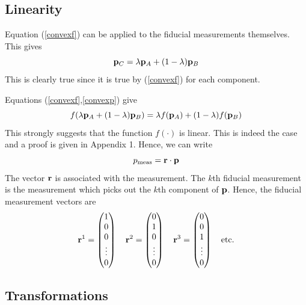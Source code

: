 \documentclass[10pt,twocolumn]{article}
\begin{document}
\subsection{Linearity}

Equation (\ref{convexf}) can be applied to the fiducial measurements
themselves.  This gives
\begin{equation}\label{convexp}
{\bf p}_C = \lambda {\bf p}_A+(1-\lambda){\bf p}_B
\end{equation}
This is clearly true since it is true by (\ref{convexf}) for each component.

Equations (\ref{convexf},\ref{convexp}) give
\begin{equation}\label{convexpf}
f(\lambda {\bf p}_A+(1-\lambda){\bf p}_B)
= \lambda f({\bf p}_A)+(1-\lambda) f({\bf p}_B)
\end{equation}
This strongly suggests that the function $f(\cdot)$ is linear.
This is indeed the case and a proof is given in Appendix 1.
Hence, we can write
\begin{equation}\label{formrp}
p_{\rm meas} = {\bf r} \cdot {\bf p}
\end{equation}
The vector ${\bf r}$ is associated with the measurement.  The $k$th fiducial
measurement is the measurement which picks out the $k$th component of
$\bf p$.  Hence, the fiducial measurement vectors are
\begin{equation}\label{fidM}
{\bf r}^1= \left(
\begin{matrix} 1 \\ 0 \\ 0 \\ \vdots \\ 0 \end{matrix} \right) \quad
{\bf r}^2= \left(
\begin{matrix} 0 \\ 1 \\ 0 \\ \vdots \\ 0 \end{matrix} \right) \quad
{\bf r}^3= \left(
\begin{matrix} 0 \\ 0 \\ 1 \\ \vdots \\ 0 \end{matrix} \right) \quad
{\rm etc.}
\end{equation}


\subsection{Transformations}
\end{document}
